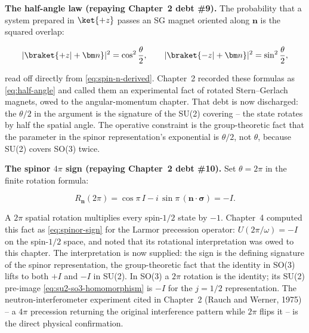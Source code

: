 \medskip\noindent\textbf{The half-angle law (repaying Chapter~2 debt \#9).}
The probability that a system prepared in $\ket{+z}$ passes an SG magnet oriented along $\bm n$ is the squared overlap:
\begin{linenomath}
  \begin{equation}
    |\braket{+z|+\bm n}|^2 = \cos^2\frac{\theta}{2},
    \qquad
    |\braket{-z|+\bm n}|^2 = \sin^2\frac{\theta}{2},
    \label{eq:half-angle-law}
  \end{equation}
\end{linenomath}
read off directly from \eqref{eq:spin-n-derived}. Chapter~2 recorded these formulas as \eqref{eq:half-angle} and called them an experimental fact of rotated Stern--Gerlach magnets, owed to the angular-momentum chapter. That debt is now discharged: the $\theta/2$ in the argument is the signature of the SU(2) covering -- the state rotates by half the spatial angle. The operative constraint is the group-theoretic fact that the parameter in the spinor representation's exponential is $\theta/2$, not $\theta$, because SU(2) covers SO(3) twice.

\medskip\noindent\textbf{The spinor $4\pi$ sign (repaying Chapter~2 debt \#10).}
Set $\theta = 2\pi$ in the finite rotation formula:
\begin{linenomath}
  \begin{equation}
    R_{\bm n}(2\pi) = \cos\pi\,I - i\,\sin\pi\,(\bm n\cdot\bm\sigma) = -I.
    \label{eq:spinor-sign-interpretation}
  \end{equation}
\end{linenomath}
A $2\pi$ spatial rotation multiplies every spin-$1/2$ state by $-1$. Chapter~4 computed this fact as \eqref{eq:spinor-sign} for the Larmor precession operator: $U(2\pi/\omega) = -I$ on the spin-$1/2$ space, and noted that its rotational interpretation was owed to this chapter. The interpretation is now supplied: the sign is the defining signature of the spinor representation, the group-theoretic fact that the identity in SO(3) lifts to both $+I$ and $-I$ in SU(2). In SO(3) a $2\pi$ rotation is the identity; its SU(2) pre-image \eqref{eq:su2-so3-homomorphism} is $-I$ for the $j=1/2$ representation. The neutron-interferometer experiment cited in Chapter~2 (Rauch and Werner, 1975) -- a $4\pi$ precession returning the original interference pattern while $2\pi$ flips it -- is the direct physical confirmation.

